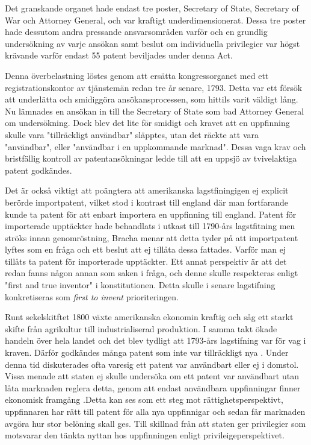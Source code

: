 Det granskande organet hade endast tre poster, Secretary of State, Secretary of War och Attorney General\cite{bracha}, och
var kraftigt underdimensionerat. Dessa tre poster hade dessutom andra pressande ansvarsområden varför
och en grundlig undersökning av varje ansökan samt beslut om individuella privilegier var högst krävande varför endast 55 patent beviljades under denna Act\cite{nard}.  

Denna överbelastning löstes genom att ersätta kongressorganet med ett registrationskontor
av tjänstemän redan tre år senare, 1793. Detta var ett försök att underlätta och smidiggöra
ansökansprocessen, som hittils varit väldigt lång. Nu lämnades en ansökan in till the Secretary of State
som bad Attorney General om undersökning. Dock blev det lite för smidigt och kravet att en uppfinning
skulle vara "tillräckligt användbar" släpptes, utan det räckte att vara "användbar", eller "användbar i
en uppkommande marknad". Dessa vaga krav och bristfällig kontroll av patentansökningar ledde till att en
uppsjö av tvivelaktiga patent godkändes\cite{nard}. 

Det är också viktigt att poängtera att amerikanska lagstfiningigen ej explicit berörde importpatent, vilket stod i kontrast till england där man fortfarande kunde ta patent för att enbart importera en uppfinning till england\cite{bracha}. Patent för importerade upptäckter hade behandlats i utkast till 1790-års lagstfitning men ströks innan genomröstning, Bracha menar att detta tyder på att importpatent lyftes som en fråga och ett beslut att ej tillåta dessa fattades\cite{bracha}. Varför man ej tillåts ta patent för importerade upptäckter. Ett annat perspektiv är att det redan fanns någon annan som saken i fråga, och denne skulle respekteras enligt "first and true inventor" i konstitutionen. Detta skulle i senare lagstifning konkretiseras som \emph{first to invent} prioriteringen. 

Runt sekelskitftet 1800 växte amerikanska ekonomin kraftig och såg ett starkt skifte från agrikultur
till industrialiserad produktion. I samma takt ökade handeln över hela landet och det blev tydligt att 1793-års lagstifning var för vag i kraven. Därför godkändes många patent som inte var tillräckligt nya \cite{nard}. Under denna tid diskuterades ofta varesig ett patent var användbart eller ej i domstol. Vissa menade att staten ej skulle undersöka om ett patent var användbart utan låta marknaden reglera detta, genom att endast användbara uppfinningar finner ekonomisk framgång \cite{bracha}.Detta kan ses som  ett steg mot rättighetsperspektivt, uppfinnaren har rätt till patent för alla nya uppfinnigar och sedan får marknaden avgöra hur stor belöning skall ges. Till skillnad från att staten ger privilegier som motsvarar den tänkta nyttan hos uppfinningen enligt privileigeperspektivet.


